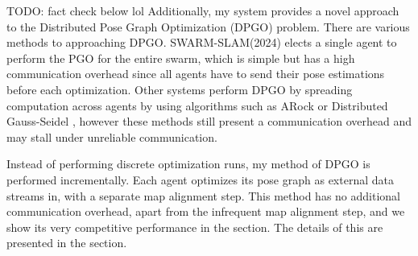 TODO: fact check below lol
Additionally, my system provides a novel approach to the Distributed Pose Graph Optimization (DPGO) problem. There are various methods to approaching DPGO. SWARM-SLAM(2024) \autocite{Lajoie_2024} elects a single agent to perform the PGO for the entire swarm, which is simple but has a high communication overhead since all agents have to send their pose estimations before each optimization. Other systems perform DPGO by spreading computation across agents by using algorithms such as ARock \autocite{Peng_2016} or Distributed Gauss-Seidel \autocite{DBLP:journals/corr/ChoudharyCNRCD17}, however these methods still present a communication overhead and may stall under unreliable communication.

Instead of performing discrete optimization runs, my method of DPGO is performed incrementally. Each agent optimizes its pose graph as external data streams in, with a separate map alignment step. This method has no additional communication overhead, apart from the infrequent map alignment step, and we show its very competitive performance in the  section. The details of this are presented in the  section.









